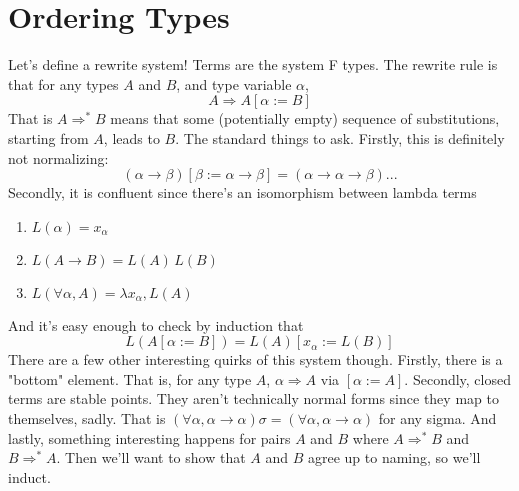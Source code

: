 \documentclass[12pt]{article}
\begin{document}
\section{Ordering Types}
Let's define a rewrite system!
Terms are the system F types.
The rewrite rule is that for any types $A$ and $B$, and type variable $\alpha$,
\[
  A \Rightarrow A[\alpha := B]
\]
That is $A \Rightarrow^* B$ means that some (potentially empty) sequence of substitutions, starting from $A$, leads to $B$.
The standard things to ask.
Firstly, this is definitely not normalizing:
\[
  (\alpha \rightarrow \beta)[\beta := \alpha \rightarrow \beta] = (\alpha \rightarrow \alpha \rightarrow \beta) ...
\]
Secondly, it is confluent since there's an isomorphism between lambda terms 
\begin{enumerate}
  \item $L(\alpha) = x_\alpha$
  \item $L (A \rightarrow B) = L(A)\, L(B)$
  \item $L (\forall \alpha, A) = \lambda x_\alpha, L(A)$
\end{enumerate}
And it's easy enough to check by induction that 
\[
  L(A[\alpha := B]) = L(A)[x_\alpha := L(B)]
\]
There are a few other interesting quirks of this system though.
Firstly, there is a "bottom" element. 
That is, for any type $A$, $\alpha \Rightarrow A$ via $[\alpha := A]$.
Secondly, closed terms are stable points.
They aren't technically normal forms since they map to themselves, sadly. 
That is $(\forall \alpha, \alpha \rightarrow \alpha)\sigma = (\forall \alpha, \alpha \rightarrow \alpha)$ for any sigma.
And lastly, something interesting happens for pairs $A$ and $B$ where $A \Rightarrow^* B$ and $B \Rightarrow^* A$.
Then we'll want to show that $A$ and $B$ agree up to naming, so we'll induct.
\end{document}
